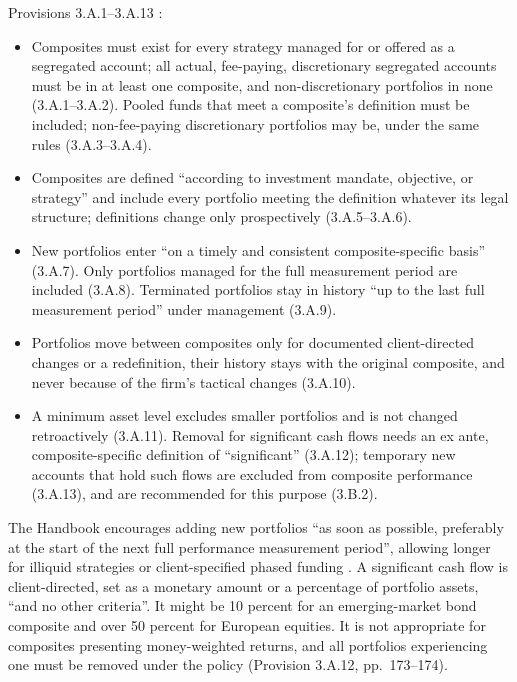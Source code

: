 \begin{qfmethod}\label{meth:gips-composite-membership}
 Provisions 3.A.1--3.A.13 \citep[sec.~3, pp.~18--19]{wide-gips-2020}:
\begin{itemize}
\item Composites must exist for every strategy managed for or offered as a segregated account; all actual, fee-paying, discretionary segregated accounts must be in at least one composite, and non-discretionary portfolios in none (3.A.1--3.A.2). Pooled funds that meet a composite's definition must be included; non-fee-paying discretionary portfolios may be, under the same rules (3.A.3--3.A.4).
\item Composites are defined ``according to investment mandate, objective, or strategy'' and include every portfolio meeting the definition whatever its legal structure; definitions change only prospectively (3.A.5--3.A.6).
\item New portfolios enter ``on a timely and consistent composite-specific basis'' (3.A.7). Only portfolios managed for the full measurement period are included (3.A.8). Terminated portfolios stay in history ``up to the last full measurement period'' under management (3.A.9).
\item Portfolios move between composites only for documented client-directed changes or a redefinition, their history stays with the original composite, and never because of the firm's tactical changes (3.A.10).
\item A minimum asset level excludes smaller portfolios and is not changed retroactively (3.A.11). Removal for significant cash flows needs an ex ante, composite-specific definition of ``significant'' (3.A.12); temporary new accounts that hold such flows are excluded from composite performance (3.A.13), and are recommended for this purpose (3.B.2).
\end{itemize}
The Handbook encourages adding new portfolios ``as soon as possible, preferably at the start of the next full performance measurement period'', allowing longer for illiquid strategies or client-specified phased funding \citep[Provision 3.A.7, pp.~166--167]{gips-handbook-firms-2020}. A significant cash flow is client-directed, set as a monetary amount or a percentage of portfolio assets, ``and no other criteria''. It might be 10 percent for an emerging-market bond composite and over 50 percent for European equities. It is not appropriate for composites presenting money-weighted returns, and all portfolios experiencing one must be removed under the policy (Provision 3.A.12, pp.~173--174).


\end{qfmethod}
